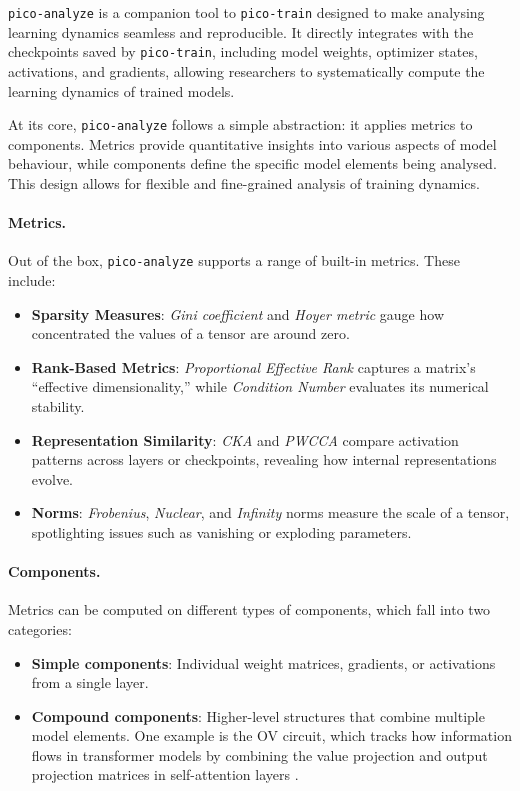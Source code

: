 \texttt{pico-analyze} is a companion tool to \texttt{pico-train} designed to make analysing learning dynamics seamless and reproducible. It directly integrates with the checkpoints saved by \texttt{pico-train}, including model weights, optimizer states, activations, and gradients, allowing researchers to systematically compute the learning dynamics of trained models.

At its core, \texttt{pico-analyze} follows a simple abstraction: it applies metrics to components. Metrics provide quantitative insights into various aspects of model behaviour, while components define the specific model elements being analysed. This design allows for flexible and fine-grained analysis of training dynamics. 

\paragraph{Metrics.} Out of the box, \texttt{pico-analyze} supports a range of built-in metrics. These include:
\begin{itemize}
    \item \textbf{Sparsity Measures}: \textit{Gini coefficient} \citep{hurley2009gini} and \textit{Hoyer metric} \citep{hoyer2004sparsity} gauge how concentrated the values of a tensor are around zero.

    \item \textbf{Rank-Based Metrics}: \textit{Proportional Effective Rank} \citep{diehlmartinez2024tending} captures a matrix's “effective dimensionality,” while \textit{Condition Number} evaluates its numerical stability.

    \item \textbf{Representation Similarity}: \textit{CKA} \citep{kornblith2019cka} and \textit{PWCCA} \citep{morcos2018pwcca} compare activation patterns across layers or checkpoints, revealing how internal representations evolve.
    
    \item \textbf{Norms}: \textit{Frobenius}, \textit{Nuclear}, and \textit{Infinity} norms measure the scale of a tensor, spotlighting issues such as vanishing or exploding parameters.
\end{itemize}

\paragraph{Components.} Metrics can be computed on different types of components, which fall into two categories: 
\begin{itemize} 
\item \textbf{Simple components}: Individual weight matrices, gradients, or activations from a single layer. 
\item \textbf{Compound components}: Higher-level structures that combine multiple model elements. One example is the OV circuit, which tracks how information flows in transformer models by combining the value projection and output projection matrices in self-attention layers \cite{elhage2021mathematical}. 
\end{itemize}

